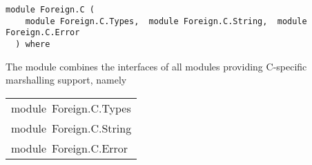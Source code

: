 \label{module:Foreign.C}
\haddockbeginheader
{\haddockverb\begin{verbatim}
module Foreign.C (
    module Foreign.C.Types,  module Foreign.C.String,  module Foreign.C.Error
  ) where\end{verbatim}}
\haddockendheader

The module  combines the interfaces of all
 modules providing C-specific marshalling support, namely
\par

\begin{haddockdesc}
\item[\begin{tabular}{@{}l}
module\ Foreign.C.Types\\module\ Foreign.C.String\\module\ Foreign.C.Error
\end{tabular}]
\end{haddockdesc}